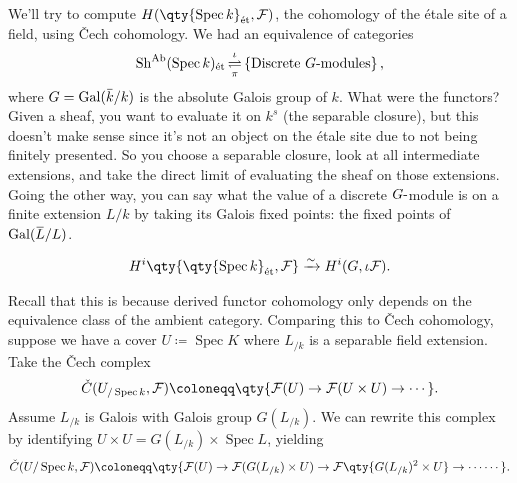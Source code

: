 \begin{example}[?]

We'll try to compute
\(H(\qty{\operatorname{Spec}k}_\text{ét}, \mathcal{F})\), the cohomology
of the étale site of a field, using Čech cohomology. We had an
equivalence of categories
\begin{align*}  
{\operatorname{Sh}}^{\operatorname{Ab}}(\operatorname{Spec}k)_\text{ét}\mathop{\mathrm{\rightleftharpoons}}^{\iota}_{\pi} \left\{{\text{Discrete $G{\hbox{-}}$modules}}\right\}
,\end{align*}
where
\(G = \operatorname{Gal}(\mkern 1.5mu\overline{\mkern-1.5muk\mkern-1.5mu}\mkern 1.5mu / k)\)
is the absolute Galois group of \(k\). What were the functors? Given a
sheaf, you want to evaluate it on \(k^s\) (the separable closure), but
this doesn't make sense since it's not an object on the étale site due
to not being finitely presented. So you choose a separable closure, look
at all intermediate extensions, and take the direct limit of evaluating
the sheaf on those extensions. Going the other way, you can say what the
value of a discrete \(G{\hbox{-}}\)module is on a finite extension
\(L/k\) by taking its Galois fixed points: the fixed points of
\(\operatorname{Gal}(\mkern 1.5mu\overline{\mkern-1.5muL\mkern-1.5mu}\mkern 1.5mu/L)\).

\begin{corollary}[?]

\begin{align*}  
H^i\qty{\qty{ \operatorname{Spec}k}_\text{ét}, \mathcal{F}} \xrightarrow{\sim}H^i(G, \iota \mathcal{F})
.\end{align*}

\end{corollary}

Recall that this is because derived functor cohomology only depends on
the equivalence class of the ambient category. Comparing this to Čech
cohomology, suppose we have a cover \(U \coloneqq\operatorname{Spec}K\)
where \(L_{/k}\) is a separable field extension. Take the Čech complex
\begin{align*}  
{\check{C}}(U_{/\operatorname{Spec}k}, \mathcal{F}) \coloneqq\qty{\mathcal{F}(U) \to \mathcal{F}(U\times U) \to \cdots}
.\end{align*}
Assume \(L_{/k}\) is Galois with Galois group \(G(L_{/k})\). We can
rewrite this complex by identifying
\(U\times U = G(L_{/k}) \times\operatorname{Spec}L\), yielding
\begin{align*}  
{\check{C}}(U/\operatorname{Spec}k, \mathcal{F}) \coloneqq\qty{\mathcal{F}(U) \to \mathcal{F}(G(L_{/k}) \times U) \to \mathcal{F}\qty{G(L_{/k})^2 \times U}
\to \cdots
\cdots}
.\end{align*}


\end{example}
